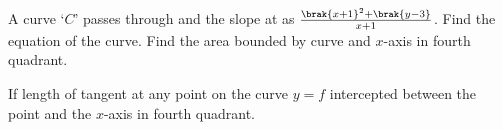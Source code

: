 \iffalse
\title{Assignment 2 - EE1030}
\author{ee24btech11018 - D. Swaraj Sharma}
\section{subjective}
\fi
	\item A curve `$C$' passes through  and the slope at  as $\frac{\brak{x+1}^2+\brak{y-3}}{x+1}$. Find the equation of the curve. Find the area bounded by curve and $x$-axis in fourth quadrant.  

		\hfill{}
\item If length of tangent at any point on the curve $y=f$ intercepted between the point and the $x$-axis in fourth quadrant. 

	\hfill{}
